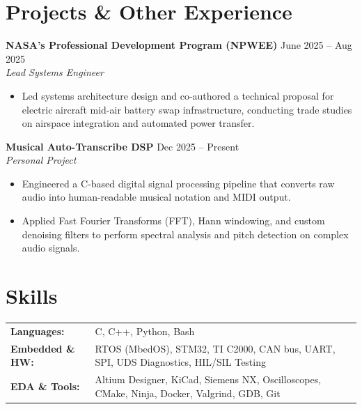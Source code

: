 \documentclass[letterpaper,10pt]{article}
\begin{document}
\section*{Projects \& Other Experience}
\textbf{NASA's Professional Development Program (NPWEE)} \hfill June 2025 -- Aug 2025 \\
\textit{Lead Systems Engineer}
\begin{itemize}
    \item Led systems architecture design and co-authored a technical proposal for electric aircraft mid-air battery swap infrastructure, conducting trade studies on airspace integration and automated power transfer.
\end{itemize}

\textbf{Musical Auto-Transcribe DSP} \hfill Dec 2025 -- Present \\
\textit{Personal Project}
\begin{itemize}
    \item Engineered a C-based digital signal processing pipeline that converts raw audio into human-readable musical notation and MIDI output.
    \item Applied Fast Fourier Transforms (FFT), Hann windowing, and custom denoising filters to perform spectral analysis and pitch detection on complex audio signals.
\end{itemize}

\section*{Skills}
\begin{tabular}{@{}ll}
\textbf{Languages:} & C, C++, Python, Bash \\
\textbf{Embedded \& HW:} & RTOS (MbedOS), STM32, TI C2000, CAN bus, UART, SPI, UDS Diagnostics, HIL/SIL Testing \\
\textbf{EDA \& Tools:} & Altium Designer, KiCad, Siemens NX, Oscilloscopes, CMake, Ninja, Docker, Valgrind, GDB, Git \\
\end{tabular}
\end{document}
